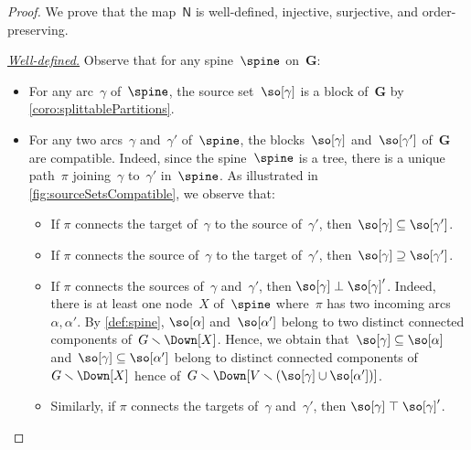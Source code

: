 \documentclass{amsart}
\theoremstyle{definition}
\renewcommand{\b}[1]{{\boldsymbol{#1}}} %
\newcommand{\ssm}{\smallsetminus} %
\newcommand{\para}[1]{\medskip\noindent\uline{\textit{#1.}}} %
\newcommand{\vincent}[1]{\todo[color=blue!30]{#1 \\ \hfill --- V.}}
\newcommand{\vertexSet}{V}
\newcommand{\negDisjoint}{\perp} %
\newcommand{\posDisjoint}{\;\top\;} %
\newcommand{\spineToNested}{\mathsf{N}} %
\begin{document}
\begin{proof}
  We prove that the map~$\spineToNested$ is well-defined, injective, surjective, and order-preserving.
  
  \para{Well-defined}
  Observe that for any spine~$\spine$ on~$\b{G}$:
  \begin{itemize}
    \item For any arc~$\gamma$ of~$\spine$, the source set~$\so[\gamma]$ is a block of~$\b{G}$ by \cref{coro:splittablePartitions}. 
    \item For any two arcs~$\gamma$ and~$\gamma'$ of~$\spine$, the blocks~$\so[\gamma]$ and~$\so[\gamma']$ of~$\b{G}$ are compatible. 
    Indeed, since the spine~$\spine$ is a tree, there is a unique path~$\pi$ joining~$\gamma$ to~$\gamma'$ in~$\spine$.
    As illustrated in \cref{fig:sourceSetsCompatible}, we observe that:
    \vincent{borrow picture...}
    \begin{itemize}
      \item If $\pi$ connects the target of~$\gamma$ to the source of~$\gamma'$, then~$\so[\gamma] \subseteq \so[\gamma']$.
      \item If $\pi$ connects the source of~$\gamma$ to the target of~$\gamma'$, then~$\so[\gamma] \supseteq \so[\gamma']$.
      \item If $\pi$ connects the sources of~$\gamma$ and~$\gamma'$, then $\so[\gamma] \negDisjoint \so[\gamma]'$.
      Indeed, there is at least one node~$X$ of~$\spine$ where~$\pi$ has two incoming arcs~$\alpha, \alpha'$.
      By \cref{def:spine}, $\so[\alpha]$ and~$\so[\alpha']$ belong to two distinct connected components of~$G \ssm \Down[X]$.
      Hence, we obtain that~${\so[\gamma] \subseteq \so[\alpha]}$ and~${\so[\gamma] \subseteq \so[\alpha']}$ belong to distinct connected components of~$G \ssm \Down[X]$ hence of~${G \ssm \Down[{\vertexSet \ssm (\so[\gamma] \cup \so[\alpha'])}]}$.
      \item Similarly, if $\pi$ connects the targets of~$\gamma$ and~$\gamma'$, then $\so[\gamma] \posDisjoint \so[\gamma]'$.
    \end{itemize}
  \end{itemize}


\end{proof}
\end{document}
